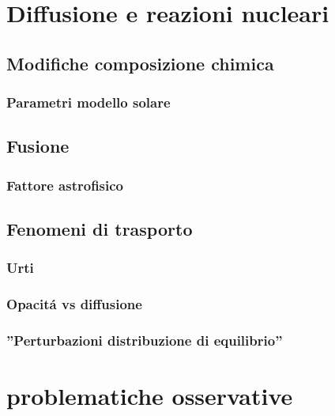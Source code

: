 \documentclass[../main.tex]{subfiles}
\begin{document}

\chapter{Diffusione e reazioni nucleari}


\cite{pit12kinetics}


\section{Modifiche composizione chimica}

\subsection{Parametri modello solare}

\section{Fusione}

\subsection{Fattore astrofisico}

\section{Fenomeni di trasporto}

\subsection{Urti}

\subsection{Opacit\'a vs diffusione}

\subsection{''Perturbazioni distribuzione di equilibrio''}


\chapter{problematiche osservative}
\end{document}
